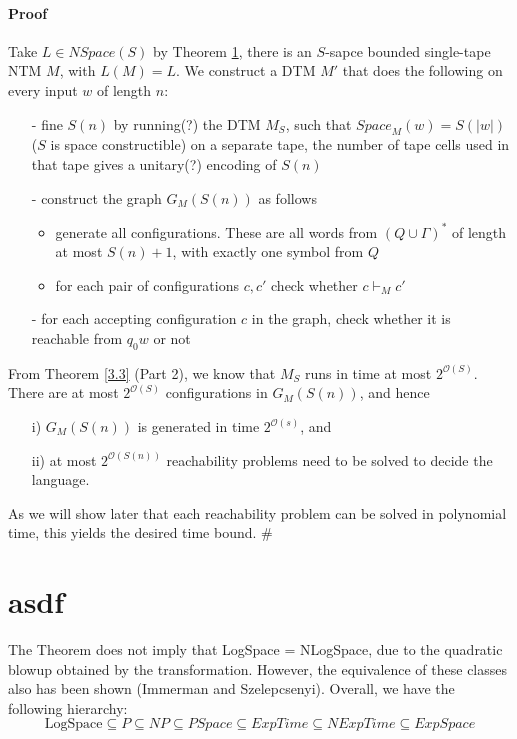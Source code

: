 \documentclass{report}
\newcommand{\NSpace}{\text{$\mathit{NSpace}$}\xspace}
\newcommand{\Space}{\text{$\mathit{Space}$}\xspace}
\newcommand{\bigO}{\text{$\mathcal{O}$}\xspace}
\begin{document}
\paragraph{Proof}Take $L \in \NSpace(S)$ by Theorem \ref{}, there is an $S$-sapce bounded single-tape NTM $M$, with $L(M) = L$. We construct a DTM $M'$ that does the following on every input $w$ of length $n$:
\begin{itemize}
\item[-] fine $S(n)$ by running(?) the DTM $M_S$, such that $\Space_M(w) = S(|w|)$ ($S$ is space constructible) on a separate tape,  the number of tape cells used in that tape gives a unitary(?) encoding of $S(n)$
\item[-] construct the graph $G_M(S(n))$ as follows
\begin{itemize}
\item generate all configurations. These are all words from $(Q \cup \Gamma)^*$ of length at most $S(n)+1$, with exactly one symbol from $Q$
\item for each pair of configurations $c,c'$ check whether $c \vdash_M c'$
\end{itemize}
\item[-] for each accepting configuration $c$ in the graph, check whether it is reachable from $q_0w$ or not
\end{itemize}
From Theorem \ref{3.3} (Part 2), we know that $M_S$ runs in time at most $2^{\bigO(S)}$. There are at most $2^{\bigO(S)}$ configurations in $G_M(S(n))$, and hence
\begin{itemize}
\item[i)]$G_M(S(n))$ is generated in time $2^{\bigO(s)}$, and 
\item[ii)]at most $2^{\bigO(S(n))}$ reachability problems need to be solved to decide the language.
\end{itemize}
As we will show later that each reachability problem can be solved in polynomial time, this yields the desired time bound. $\#$\\


\section{asdf}
The Theorem does not imply that LogSpace = NLogSpace, due to the quadratic blowup obtained by the transformation. However, the equivalence of these classes also has been shown (Immerman and Szelepcsenyi). Overall, we have the following hierarchy:
\[ \text{LogSpace} \subseteq P \subseteq NP \subseteq PSpace \subseteq ExpTime \subseteq NExpTime \subseteq ExpSpace\]
\end{document}
